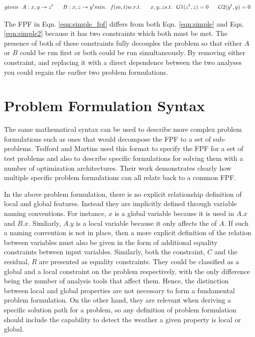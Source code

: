     \begin{align}
        given & \ \ A: {x,y} \rightarrow {z^t}
              & \ \ B: {x,z} \rightarrow {y^t}
        min. &\ \ f(m,t) \notag
        w.r.t. & \ \ x,y,z \notag
        s.t. & \ \ G1(z^t,z) = 0 \notag
             & \ \ G2(y^t,y) = 0
        \label{eqn:simple_fpf}
    \end{align}

    The FPF in Eqn. \ref{eqn:simple_fpf} differs from both Eqn. \ref{eqn:simple} and Eqn. \ref{eqn:simple2} because it has 
    two constraints which both must be met. The presence of both of these constraints fully decouples the problem so that 
    either $A$ or $B$ could be run first or both could be run simultaneously. By removing either constraint, and replacing 
    it with a direct dependence between the two analyses you could regain the earlier two problem formulations. 

    \section{Problem Formulation Syntax}

    The same mathematical syntax can be used to describe more complex problem formulations
    such as ones that would decompose the FPF to a set of sub-problems. Tedford and Martins used this format to specify the 
    FPF for a set of test problems and also to describe specific formulations for solving them with a 
    number of optimization architectures\cite{Tedford2009}. Their work demonstrates clearly how multiple specific 
    problem formulations can all relate back to a common FPF. 

    In the above problem formulation, there is no explicit relationship definition of local and global features. Instead they are 
    implicitly defined through variable naming conventions. For instance, $x$ is a global variable because it is used in $A.x$ and $B.x$. 
    Simliarly, $A.y$ is a local variable because it only affects the of $A$. If such a naming convention is not in place, 
    then a more explicit definition of the relation between variables must also be given in the form of additional equality constraints between 
    input variables. Similarly, both the constraint, $C$ and the residual, $R$ are presented as equality constraints. They could be classified as 
    a global and a local constraint on the problem respectively, with the only difference being the number of analysis tools that affect them.  
    Hence, the distinction between local and global properties are not necessary to form a fundamental 
    problem formulation. On the other hand, they are relevant when deriving a specific solution path for a problem, so any definition of problem 
    formulation should include the capability to detect the weather a given property is local or global. 

